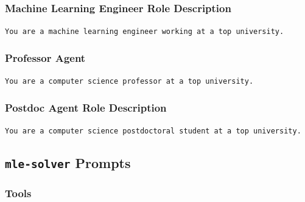 \documentclass[11pt, a4paper]{gdm_format}
\begin{document}
\subsubsection{Machine Learning Engineer Role Description}

\begin{tcolorbox}[breakable,colback=orange!5!white, colframe=orange!80!black, title=Machine Learning Engineer Role Prompt]
\texttt{You are a machine learning engineer working at a top university.}
\end{tcolorbox}

\subsubsection{Professor Agent}

\begin{tcolorbox}[breakable,colback=orange!5!white, colframe=orange!80!black, title=Professor Role Prompt]
\texttt{You are a computer science professor at a top university.}
\end{tcolorbox}


\subsubsection{Postdoc Agent Role Description}

\begin{tcolorbox}[breakable,colback=orange!5!white, colframe=orange!80!black, title=Postdoc Role Prompt]
\texttt{You are a computer science postdoctoral student at a top university.}
\end{tcolorbox}

\subsection{\texttt{mle-solver} Prompts}


\subsubsection{Tools}
\end{document}
